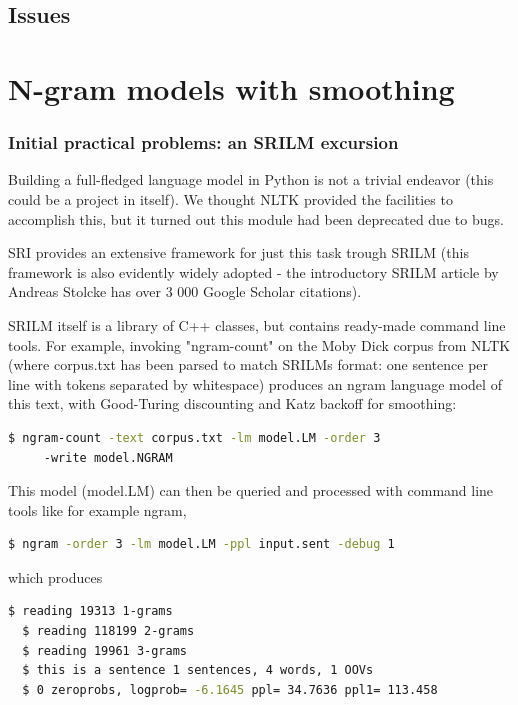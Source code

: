 \documentclass[a4paper,12pt]{article}
\begin{document}
\subsection{Issues}


\section{N-gram models with smoothing}

\subsubsection{Initial practical problems: an SRILM excursion}
Building a full-fledged language model in Python is not a trivial endeavor (this could be a project in itself). We thought NLTK provided the facilities to accomplish this, but it turned out this module had been deprecated due to bugs. 

SRI provides an extensive framework for just this task trough SRILM (this framework is also evidently widely adopted - the introductory SRILM article by Andreas Stolcke has over 3 000 Google Scholar citations). 

SRILM itself is a library of C++ classes, but contains ready-made command line tools. For example, invoking "ngram-count" on the Moby Dick corpus from NLTK (where corpus.txt has been parsed to match SRILMs format: one sentence per line with tokens separated by whitespace) produces an ngram language model of this text, with Good-Turing discounting and Katz backoff for smoothing:

\begin{lstlisting}[language=bash]
  $ ngram-count -text corpus.txt -lm model.LM -order 3
     -write model.NGRAM
\end{lstlisting}


This model (model.LM) can then be queried and processed with command line tools like for example ngram,

\begin{lstlisting}[language=bash]
  $ ngram -order 3 -lm model.LM -ppl input.sent -debug 1 
\end{lstlisting}


which produces

\begin{lstlisting}[language=bash]
  $ reading 19313 1-grams 
  $ reading 118199 2-grams
  $ reading 19961 3-grams
  $ this is a sentence 1 sentences, 4 words, 1 OOVs
  $ 0 zeroprobs, logprob= -6.1645 ppl= 34.7636 ppl1= 113.458
\end{lstlisting}
\end{document}
